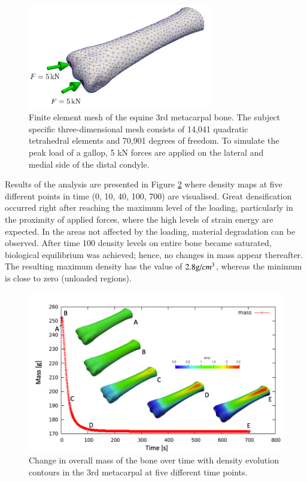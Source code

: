 \documentclass[11pt]{acmeArticle}
\numberwithin{equation}{section}
\begin{document}
\begin{figure}[h!]
	\begin{centering}
		\includegraphics[width=8cm]{Figures/mc3_BC.png}
		\caption{Finite element mesh of the equine 3rd metacarpal bone. The subject specific three-dimensional mesh consists of 14,041 quadratic tetrahedral elements and 70,901 degrees of freedom. To simulate the peak load of a gallop, 5 kN forces are applied on the lateral and medial side of the distal condyle.}
		\label{fig:mc3_BC}
	\end{centering}
\end{figure}
Results of the analysis are presented in Figure \ref{fig:mc3_density} where density maps at five different points in time (0, 10, 40, 100, 700) are visualised. Great densification occurred right after reaching the maximum level of the loading, particularly in the proximity of applied forces, where the high levels of strain energy are expected. In the areas not affected by the loading, material degradation can be observed. After time 100 density levels on entire bone became saturated, biological equilibrium was achieved; hence, no changes in mass appear thereafter. The resulting maximum density has the value of $2.8 \text g \text / {cm}^3$, whereas the minimum is close to zero (unloaded regions).
\begin{figure}[h!]
	\begin{centering}
		\includegraphics[width=15cm]{Figures/graphs/mc3_density.png}
		\caption{Change in overall mass of the bone over time with density evolution contours in the 3rd metacarpal at five different time points.}
		\label{fig:mc3_density}
	\end{centering}
\end{figure}
\end{document}
